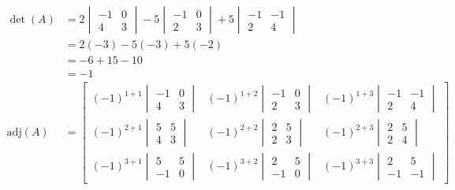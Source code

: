 \documentclass[
  letterpaper,
  DIV=11,
  numbers=noendperiod]{scrartcl}
\begin{document}
\begin{align*}
\det(A) &= 2\begin{vmatrix}-1 & 0 \\ 4 & 3\end{vmatrix}-5\begin{vmatrix}-1 & 0 \\ 2 & 3\end{vmatrix}+5\begin{vmatrix}-1 & -1 \\ 2 & 4\end{vmatrix} \\
&= 2(-3)-5(-3)+5(-2) \\
&= -6+15-10 \\
&= -1 \\
\text{adj}(A) &= \begin{bmatrix}(-1)^{1+1}\begin{vmatrix}-1 & 0 \\ 4 & 3\end{vmatrix} & (-1)^{1+2}\begin{vmatrix}-1 & 0 \\ 2 & 3\end{vmatrix} & (-1)^{1+3}\begin{vmatrix}-1 & -1 \\ 2 & 4\end{vmatrix} \\ (-1)^{2+1}\begin{vmatrix}5 & 5 \\ 4 & 3\end{vmatrix} & (-1)^{2+2}\begin{vmatrix}2 & 5 \\ 2 & 3\end{vmatrix} & (-1)^{2+3}\begin{vmatrix}2 & 5 \\ 2 & 4\end{vmatrix} \\ (-1)^{3+1}\begin{vmatrix}5 & 5 \\ -1 & 0\end{vmatrix} & (-1)^{3+2}\begin{vmatrix}2 & 5 \\ -1 & 0\end{vmatrix} & (-1)^{3+3}\begin{vmatrix}2 & 5 \\ -1 & -1\end{vmatrix}\end{bmatrix} \\

\end{align*}
\end{document}
